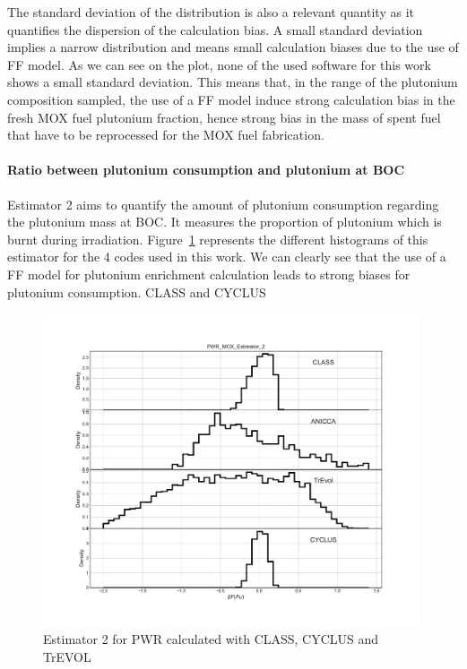 The standard deviation of the distribution is also a relevant quantity as it quantifies the dispersion of the calculation bias. A small standard deviation implies a narrow distribution and means small calculation biases due to the use of FF model. As we can see on the plot, none of the used software for this work shows a small standard deviation. This means that, in the range of the plutonium composition sampled, the use of a FF model induce strong calculation bias in the fresh MOX fuel plutonium fraction, hence strong bias in the mass of spent fuel that have to be reprocessed for the MOX fuel fabrication.

\paragraph{Ratio between plutonium consumption and plutonium at BOC}
Estimator 2 aims to quantify the amount of plutonium consumption regarding the plutonium mass at BOC. It measures the proportion of plutonium which is burnt during irradiation. Figure~\ref{fig:Est2_PWR} represents the different histograms of this estimator for the 4 codes used in this work. We can clearly see that the use of a FF model for plutonium enrichment calculation leads to strong biases for plutonium consumption. CLASS and CYCLUS  
\begin{figure}[h]
	\begin{center}
		\includegraphics[width = 0.99\textwidth]{../../Feature_1/RAW_DATA/FIG/PWR_MOX_Estimator_2.pdf}
		\caption{Estimator 2 for PWR calculated with CLASS, CYCLUS and TrEVOL}
		\label{fig:Est2_PWR}
	\end{center}
\end{figure}


